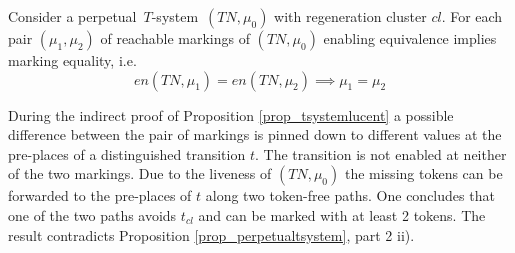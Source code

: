 \documentclass{fundam}
\begin{document}
\begin{proposition}\label{prop_tsystemlucent}
Consider a \mbox{perpetual $T$-system $(TN,\mu_0)$} with regeneration cluster $cl$. For each pair $(\mu_1,\mu_2)$ of reachable markings of $(TN,\mu_0)$ enabling equivalence implies marking equality, i.e.
$$en(TN,\mu_1)=en(TN,\mu_2) \implies \mu_1=\mu_2$$
\end{proposition}
During the indirect proof of Proposition \ref{prop_tsystemlucent} a possible difference between the pair of markings is pinned down to different values at the pre-places of a distinguished transition $t$. The transition is not enabled at neither of the two markings. Due to the liveness of $(TN,\mu_0)$ the missing tokens can be forwarded to the pre-places of $t$ along two token-free paths. One concludes that one of the two paths avoids $t_{cl}$ and can be marked with at least 2 tokens. The result contradicts Proposition \ref{prop_perpetualtsystem}, part 2 ii).
\end{document}
